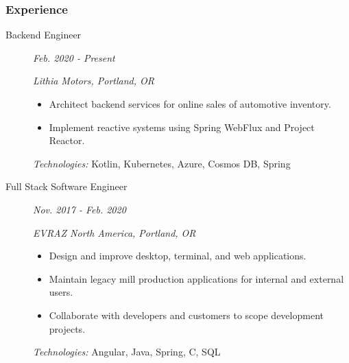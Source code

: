 \documentclass{article}
\begin{document}

\subsubsection*{Experience}

    \begin{description}
		
	\item[Backend Engineer] \hfill \textit{Feb. 2020 - Present}
		
        \textit{Lithia Motors, Portland, OR}
        \begin{itemize}     
        \item Architect backend services for online sales of automotive inventory.
        \item Implement reactive systems using Spring WebFlux and Project Reactor.
          
        \end{itemize}
        \textit{Technologies:} Kotlin, Kubernetes, Azure, Cosmos DB, Spring
		\vspace{0.5em}

	\item[Full Stack Software Engineer] \hfill \textit{Nov. 2017 - Feb. 2020}
		
        \textit{EVRAZ North America, Portland, OR}
        \begin{itemize}     
            \item Design and improve desktop, terminal, and web applications.
            \item Maintain legacy mill production applications for internal and external users.
            \item Collaborate with developers and customers to scope development projects.
        \end{itemize}
        \textit{Technologies:} Angular, Java, Spring, C, SQL
        
    \end{description}
    
\end{document}
